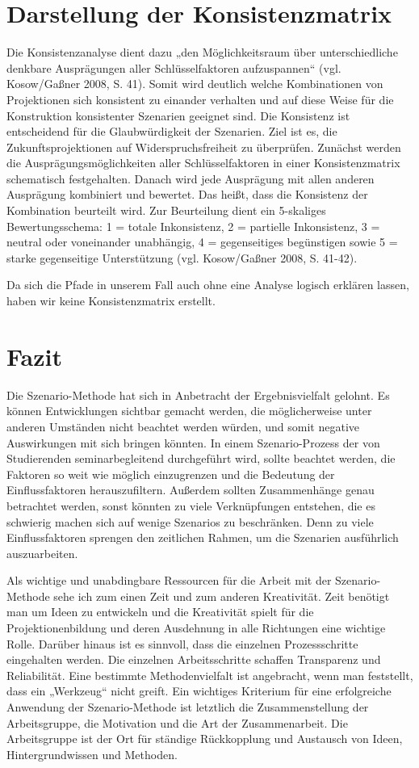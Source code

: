 \documentclass[12pt,a4paper]{article}
\begin{document}
\section{Darstellung der Konsistenzmatrix}
Die Konsistenzanalyse dient dazu „den Möglichkeitsraum über unterschiedliche denkbare Ausprägungen aller Schlüsselfaktoren aufzuspannen“ (vgl. Kosow/Gaßner 2008, S. 41)\cite{Kosow2008}. Somit wird deutlich welche Kombinationen von Projektionen sich konsistent zu einander verhalten und auf diese Weise für die Konstruktion konsistenter Szenarien geeignet sind. Die Konsistenz ist entscheidend für die Glaubwürdigkeit der Szenarien. Ziel ist es, die Zukunftsprojektionen auf Widerspruchsfreiheit zu überprüfen. Zunächst werden die Ausprägungsmöglichkeiten aller Schlüsselfaktoren in einer Konsistenzmatrix schematisch festgehalten. Danach wird jede Ausprägung mit allen anderen Ausprägung kombiniert und bewertet. Das heißt, dass die Konsistenz der Kombination beurteilt wird. Zur Beurteilung dient ein 5-skaliges Bewertungsschema: 1 = totale Inkonsistenz, 2 = partielle Inkonsistenz, 3 = neutral oder voneinander unabhängig, 4 = gegenseitiges begünstigen sowie 5 = starke gegenseitige Unterstützung (vgl. Kosow/Gaßner 2008, S. 41-42). 

Da sich die Pfade in unserem Fall auch ohne eine Analyse logisch erklären lassen, haben wir keine Konsistenzmatrix erstellt. 

\pagebreak
\section{Fazit}
Die Szenario-Methode hat sich in Anbetracht der Ergebnisvielfalt gelohnt. Es können Entwicklungen sichtbar gemacht werden, die möglicherweise unter anderen Umständen nicht beachtet werden würden, und somit negative Auswirkungen mit sich bringen könnten. In einem Szenario-Prozess der von Studierenden seminarbegleitend durchgeführt wird, sollte beachtet werden, die Faktoren so weit wie möglich einzugrenzen und die Bedeutung der Einflussfaktoren herauszufiltern. Außerdem sollten Zusammenhänge genau betrachtet werden, sonst könnten zu viele Verknüpfungen entstehen, die es schwierig machen sich auf wenige Szenarios zu beschränken. Denn zu viele Einflussfaktoren sprengen den zeitlichen Rahmen, um die Szenarien ausführlich auszuarbeiten. 

Als wichtige und unabdingbare Ressourcen für die Arbeit mit der Szenario-Methode sehe ich zum einen Zeit und zum anderen Kreativität. Zeit benötigt man um Ideen zu entwickeln und die Kreativität spielt für die Projektionenbildung und deren Ausdehnung in alle Richtungen eine wichtige Rolle. Darüber hinaus ist es sinnvoll, dass die einzelnen Prozessschritte eingehalten werden. Die einzelnen Arbeitsschritte schaffen Transparenz und Reliabilität. Eine bestimmte Methodenvielfalt ist angebracht, wenn man feststellt, dass ein „Werkzeug“ nicht greift. 
Ein wichtiges Kriterium für eine erfolgreiche Anwendung der Szenario-Methode ist letztlich die Zusammenstellung der Arbeitsgruppe, die Motivation und die Art der Zusammenarbeit. Die Arbeitsgruppe ist der Ort für ständige Rückkopplung und Austausch von Ideen, Hintergrundwissen und Methoden.
\end{document}
